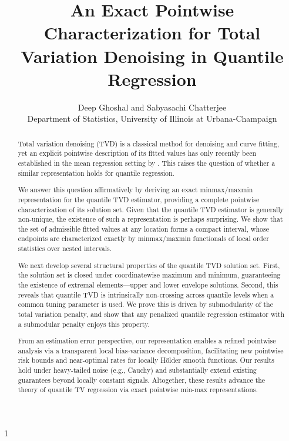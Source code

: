 \documentclass[11pt]{article}
\newcommand{\blind}{1}
\theoremstyle{plain}
\theoremstyle{definition}
\theoremstyle{remark}
\begin{document}
\date{}

%

\def\spacingset#1{\renewcommand{\baselinestretch}%
{#1}\small\normalsize} \spacingset{1}



\blind
{
  \title{An Exact Pointwise Characterization for Total Variation Denoising in Quantile Regression}
  \author{Deep Ghoshal and Sabyasachi Chatterjee \\
    Department of Statistics, University of Illinois at Urbana-Champaign
  }
  \maketitle
}
\fi

\bigskip




\begin{abstract}
Total variation denoising (TVD) is a classical method for denoising and curve fitting, yet an explicit pointwise description of its fitted values has only recently been established in the mean regression setting by \cite{chatterjee2026minmaxtrendfilteringgeneralizations}. This raises the question of whether a similar representation holds for quantile regression.

 We answer this question affirmatively by deriving an exact minmax/maxmin representation for the quantile TVD estimator, providing a complete pointwise characterization of its solution set. Given that the quantile TVD estimator is generally non-unique, the existence of such a representation is perhaps surprising. We show that the set of admissible fitted values at any location forms a compact interval, whose endpoints are characterized exactly by minmax/maxmin functionals of local order statistics over nested intervals.

 We next develop several structural properties of the quantile TVD solution set. First, the solution set is closed under coordinatewise maximum and minimum, guaranteeing the existence of extremal elements—upper and lower envelope solutions. Second, this reveals that quantile TVD is intrinsically non-crossing across quantile levels when a common tuning parameter is used. We prove this is driven by submodularity of the total variation penalty, and show that any penalized quantile regression estimator with a submodular penalty enjoys this property.

 From an estimation error perspective, our representation enables a refined pointwise analysis via a transparent local bias-variance decomposition, facilitating new pointwise risk bounds and near-optimal rates for locally H\"{o}lder smooth functions. Our results hold under heavy-tailed noise (e.g., Cauchy) and substantially extend existing guarantees beyond locally constant signals. Altogether, these results advance the theory of quantile TV regression via exact pointwise min-max representations. 
\end{abstract}
\end{document}
